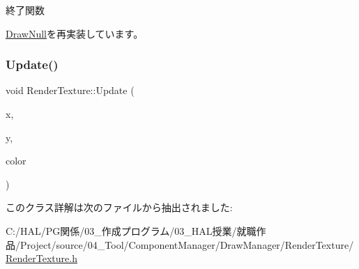 終了関数 



\mbox{\hyperlink{class_draw_null_a12d44e341c7364b5ab9cdd661dc16187}{Draw\+Null}}を再実装しています。

\mbox{\label{class_render_texture_ac27f8cfac7903dd502de61e22abfc457}} 
\subsubsection{\texorpdfstring{Update()}{Update()}}
{\footnotesize\ttfamily void Render\+Texture\+::\+Update (\begin{DoxyParamCaption}\item[{float}]{x,  }\item[{float}]{y,  }\item[{\mbox{\hyperlink{_vector3_d_8h_a680c30c4a07d86fe763c7e01169cd6cc}{X\+Color4}}}]{color }\end{DoxyParamCaption})\hspace{0.3cm}{\ttfamily [inline]}}



このクラス詳解は次のファイルから抽出されました\+:\begin{DoxyCompactItemize}
\item 
C\+:/\+H\+A\+L/\+P\+G関係/03\+\_\+作成プログラム/03\+\_\+\+H\+A\+L授業/就職作品/\+Project/source/04\+\_\+\+Tool/\+Component\+Manager/\+Draw\+Manager/\+Render\+Texture/\mbox{\hyperlink{_render_texture_8h}{Render\+Texture.\+h}}\end{DoxyCompactItemize}
